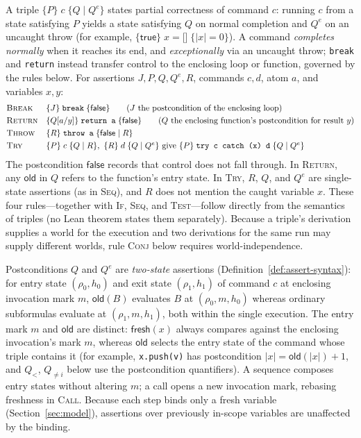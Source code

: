 \documentclass[10pt,a4paper]{article}
\theoremstyle{definition}
\theoremstyle{remark}
\newcommand{\kw}[1]{\mathsf{#1}}
\newcommand{\fresh}{\kw{fresh}}
\newcommand{\old}{\kw{old}}
\newcommand{\len}[1]{|#1|}
\newcommand{\hoare}[3]{\{#1\}\;#2\;\{#3\}}
\newcommand{\hoarex}[4]{\{#1\}\;#2\;\{#3\mid #4\}}
\newcommand{\code}[1]{\texttt{#1}}
\begin{document}
\noindent
A triple $\hoarex PcQ{Q^{e}}$ states partial correctness of command $c$:
running $c$ from a state satisfying $P$ yields a state satisfying $Q$ on
normal completion and $Q^{e}$ on an uncaught throw (for example,
$\hoare{\kw{true}}{x=\code{[]}}{\len x=0}$). A command \emph{completes
normally} when it reaches its end, and \emph{exceptionally} via an
uncaught throw; \code{break} and \code{return} instead transfer control
to the enclosing loop or function, governed by the rules below. For
assertions $J,P,Q,Q^{e},R$, commands $c,d$, atom $a$, and variables
$x,y$:
{\small\begin{displaymath}
\begin{array}{@{}ll@{}}
\textsc{Break} & \hoare{J}{\code{break}}{\kw{false}}\qquad (J\text{ the postcondition of the enclosing loop})\\[3pt]
\textsc{Return} & \hoare{Q[a/y]}{\code{return a}}{\kw{false}}\qquad (Q\text{ the enclosing function's postcondition for result }y)\\[3pt]
\textsc{Throw} & \hoarex{R}{\code{throw a}}{\kw{false}}{R}\\[3pt]
\textsc{Try} & \hoarex{P}{c}{Q}{R},\ \hoarex{R}{d}{Q}{Q^{e}}\ \text{give}\ \hoarex{P}{\code{try c catch (x) d}}{Q}{Q^{e}}
\end{array}
\end{displaymath}}
The postcondition $\kw{false}$ records that control does not fall
through. In \textsc{Return}, any $\old$ in $Q$ refers to the function's
entry state. In \textsc{Try}, $R$, $Q$, and $Q^{e}$ are single-state
assertions (as in \textsc{Seq}), and $R$ does not mention the caught
variable $x$. These four rules---together with \textsc{If}, \textsc{Seq},
and \textsc{Test}---follow directly from the semantics of triples (no
Lean theorem states them separately). Because a triple's derivation
supplies a world for the execution and two derivations for the same run
may supply different worlds, rule \textsc{Conj} below requires
world-independence.

Postconditions $Q$ and $Q^{e}$ are \emph{two-state} assertions
(Definition~\ref{def:assert-syntax}): for entry state $(\rho_0,h_0)$ and
exit state $(\rho_1,h_1)$ of command $c$ at enclosing invocation mark
$m$, $\old(B)$ evaluates $B$ at $(\rho_0,m,h_0)$ whereas ordinary
subformulas evaluate at $(\rho_1,m,h_1)$, both within the single
execution. The entry mark $m$ and $\old$ are distinct: $\fresh(x)$ always
compares against the enclosing invocation's mark $m$, whereas $\old$
selects the entry state of the command whose triple contains it (for
example, \code{x.push(v)} has postcondition $\len x=\old(\len x)+1$, and
$Q_{<}$, $Q_{\ne i}$ below use the postcondition quantifiers). A sequence
composes entry states without altering $m$; a call opens a new invocation
mark, rebasing freshness in \textsc{Call}. Because each
step binds only a fresh variable (Section~\ref{sec:model}), assertions
over previously in-scope variables are unaffected by the binding.
\end{document}
